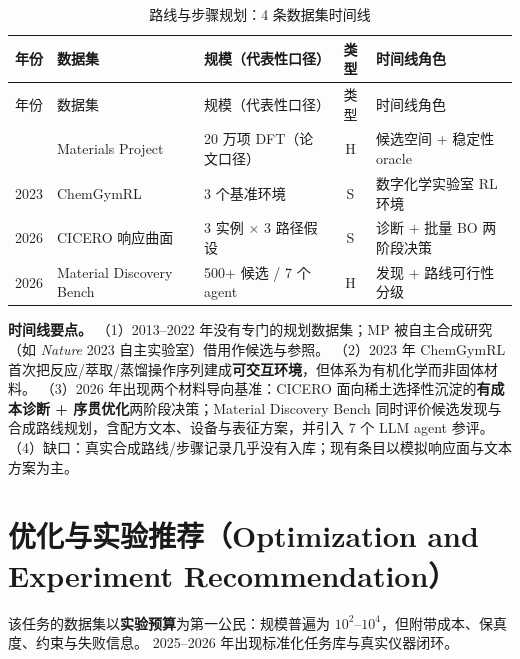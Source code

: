 \documentclass[11pt,a4paper]{ctexart}
\begin{document}
\begin{longtable}{@{}p{1.1cm}p{3.6cm}p{4.3cm}cp{5.4cm}@{}}
\caption{路线与步骤规划：4 条数据集时间线}\\
\toprule
年份 & 数据集 & 规模（代表性口径） & 类型 & 时间线角色 \\
\midrule
\endfirsthead
\toprule
年份 & 数据集 & 规模（代表性口径） & 类型 & 时间线角色 \\
\midrule
\endhead
\bottomrule
\endfoot
2013 & Materials Project & 20 万项 DFT（论文口径） & H & 候选空间 + 稳定性 oracle \\
2023 & ChemGymRL & 3 个基准环境 & S & 数字化学实验室 RL 环境 \\
2026 & CICERO 响应曲面 & 3 实例 $\times$ 3 路径假设 & S & 诊断 + 批量 BO 两阶段决策 \\
2026 & Material Discovery Bench & 500+ 候选 / 7 个 agent & H & 发现 + 路线可行性分级 \\
\end{longtable}

\textbf{时间线要点。}
（1）2013--2022 年没有专门的规划数据集；MP 被自主合成研究（如 \textit{Nature} 2023 自主实验室）借用作候选与参照。
（2）2023 年 ChemGymRL 首次把反应/萃取/蒸馏操作序列建成\textbf{可交互环境}，但体系为有机化学而非固体材料。
（3）2026 年出现两个材料导向基准：CICERO 面向稀土选择性沉淀的\textbf{有成本诊断 + 序贯优化}两阶段决策；Material Discovery Bench 同时评价候选发现与合成路线规划，含配方文本、设备与表征方案，并引入 7 个 LLM agent 参评。
（4）缺口：真实合成路线/步骤记录几乎没有入库；现有条目以模拟响应面与文本方案为主。

\section{优化与实验推荐（Optimization and Experiment Recommendation）}

该任务的数据集以\textbf{实验预算}为第一公民：规模普遍为 $10^2$--$10^4$，但附带成本、保真度、约束与失败信息。
2025--2026 年出现标准化任务库与真实仪器闭环。
\end{document}
